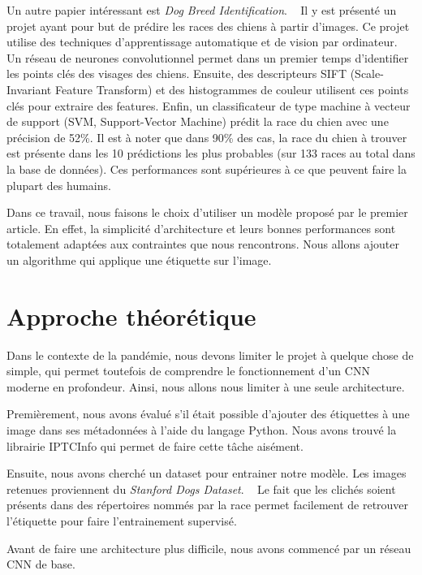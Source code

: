 \documentclass{article}
\begin{document}
Un autre papier intéressant est \textit{Dog Breed Identification}. ~\cite{output} Il 
y est présenté un projet ayant pour but de prédire les races des chiens à partir
d’images. Ce projet utilise des techniques d’apprentissage automatique et de vision
par ordinateur. Un réseau de neurones convolutionnel permet dans un premier
temps d’identifier les points clés des visages des chiens. Ensuite, des descripteurs
SIFT (Scale-Invariant Feature Transform) et des histogrammes de couleur utilisent 
ces points clés pour extraire des features. Enfin, un classificateur de type machine 
à vecteur de support (SVM, Support-Vector Machine) prédit la race du chien avec
une précision de 52\%. Il est à noter que dans 90\% des cas, la race du chien à 
trouver est présente dans les 10 prédictions les plus probables (sur 133 races au
total dans la base de données). Ces performances sont supérieures à ce que
peuvent faire la plupart des humains.

Dans ce travail, nous faisons le choix d'utiliser un modèle proposé par le premier
article. En effet, la simplicité d’architecture et leurs bonnes performances sont
totalement adaptées aux contraintes que nous rencontrons. Nous allons ajouter un
algorithme qui applique une étiquette sur l'image.

\section{Approche théorétique}
Dans le contexte de la pandémie, nous devons limiter le projet à quelque chose de
simple, qui permet toutefois de comprendre le fonctionnement d'un CNN moderne en 
profondeur. Ainsi, nous allons nous limiter à une seule architecture.

Premièrement, nous avons évalué s'il était possible d'ajouter des étiquettes à une
image dans ses métadonnées à l'aide du langage Python. Nous avons trouvé la
librairie IPTCInfo qui permet de faire cette tâche aisément.

Ensuite, nous avons cherché un dataset pour entrainer notre modèle. Les images
retenues proviennent du \textit{Stanford Dogs Dataset}. 
~\cite{KhoslaYaoJayadevaprakashFeiFei_FGVC2011} Le fait que les clichés soient
présents dans des répertoires nommés par la race permet facilement de retrouver
l'étiquette pour faire l'entrainement supervisé. 

Avant de faire une architecture plus difficile, nous avons commencé par un réseau CNN de base.
\end{document}
